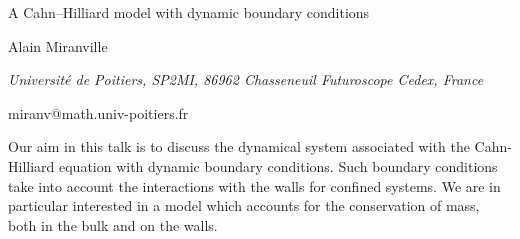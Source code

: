 \documentclass[10pt,a4paper]{article}
\begin{document}
\begin{center}

{\Large A Cahn--Hilliard model with dynamic boundary conditions}

\bigskip

{\sc Alain Miranville}

{\small\it Universit{\'e} de Poitiers, SP2MI, 86962 Chasseneuil Futuroscope Cedex, France}

{\small\rm miranv@math.univ-poitiers.fr}

\end{center}


\bigskip

Our aim in this talk is to discuss the dynamical system associated with the Cahn-Hilliard equation with dynamic boundary conditions. Such boundary conditions take into account the interactions with the walls for confined systems. We are in particular interested in a model which accounts for the conservation of mass, both in the bulk and on the walls.        
\end{document}
